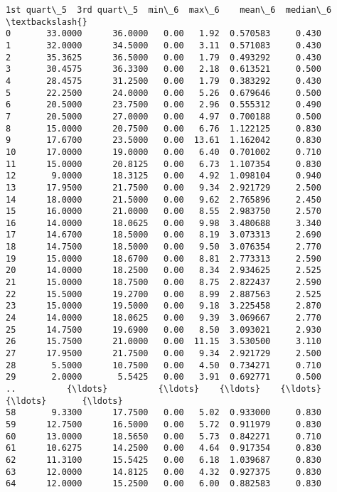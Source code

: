 \documentclass[11pt]{article}
\begin{document}
\begin{Verbatim}[commandchars=\\\{\}]
    1st quart\_5  3rd quart\_5  min\_6  max\_6    mean\_6  median\_6  \textbackslash{}
0       33.0000      36.0000   0.00   1.92  0.570583     0.430   
1       32.0000      34.5000   0.00   3.11  0.571083     0.430   
2       35.3625      36.5000   0.00   1.79  0.493292     0.430   
3       30.4575      36.3300   0.00   2.18  0.613521     0.500   
4       28.4575      31.2500   0.00   1.79  0.383292     0.430   
5       22.2500      24.0000   0.00   5.26  0.679646     0.500   
6       20.5000      23.7500   0.00   2.96  0.555312     0.490   
7       20.5000      27.0000   0.00   4.97  0.700188     0.500   
8       15.0000      20.7500   0.00   6.76  1.122125     0.830   
9       17.6700      23.5000   0.00  13.61  1.162042     0.830   
10      17.0000      19.0000   0.00   6.40  0.701002     0.710   
11      15.0000      20.8125   0.00   6.73  1.107354     0.830   
12       9.0000      18.3125   0.00   4.92  1.098104     0.940   
13      17.9500      21.7500   0.00   9.34  2.921729     2.500   
14      18.0000      21.5000   0.00   9.62  2.765896     2.450   
15      16.0000      21.0000   0.00   8.55  2.983750     2.570   
16      14.0000      18.0625   0.00   9.98  3.480688     3.340   
17      14.6700      18.5000   0.00   8.19  3.073313     2.690   
18      14.7500      18.5000   0.00   9.50  3.076354     2.770   
19      15.0000      18.6700   0.00   8.81  2.773313     2.590   
20      14.0000      18.2500   0.00   8.34  2.934625     2.525   
21      15.0000      18.7500   0.00   8.75  2.822437     2.590   
22      15.5000      19.2700   0.00   8.99  2.887563     2.525   
23      15.0000      19.5000   0.00   9.18  3.225458     2.870   
24      14.0000      18.0625   0.00   9.39  3.069667     2.770   
25      14.7500      19.6900   0.00   8.50  3.093021     2.930   
26      15.7500      21.0000   0.00  11.15  3.530500     3.110   
27      17.9500      21.7500   0.00   9.34  2.921729     2.500   
28       5.5000      10.7500   0.00   4.50  0.734271     0.710   
29       2.0000       5.5425   0.00   3.91  0.692771     0.500   
..          {\ldots}          {\ldots}    {\ldots}    {\ldots}       {\ldots}       {\ldots}   
58       9.3300      17.7500   0.00   5.02  0.933000     0.830   
59      12.7500      16.5000   0.00   5.72  0.911979     0.830   
60      13.0000      18.5650   0.00   5.73  0.842271     0.710   
61      10.6275      14.2500   0.00   4.64  0.917354     0.830   
62      11.3100      15.5425   0.00   6.18  1.039687     0.830   
63      12.0000      14.8125   0.00   4.32  0.927375     0.830   
64      12.0000      15.2500   0.00   6.00  0.882583     0.830   

\end{Verbatim}
\end{document}
